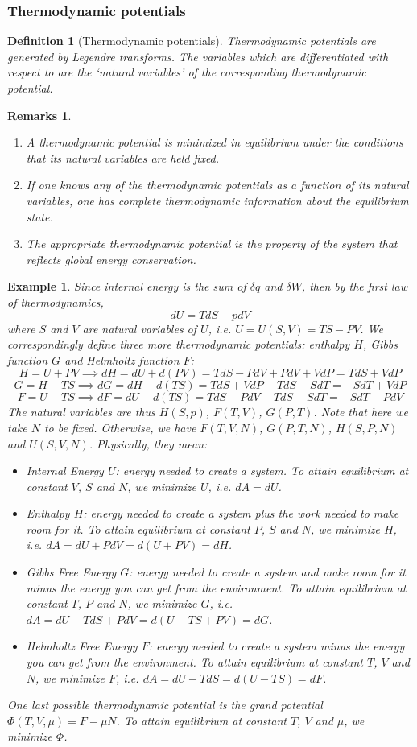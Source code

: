 \documentclass[a4paper]{article}
\newtheorem{eg}{Example}[section]
\newtheorem{remarks}{Remarks}[section]
\theoremstyle{new}
\newtheorem{defi}{Definition}[section]
\begin{document}
\subsubsection*{Thermodynamic potentials}
\begin{defi}[Thermodynamic potentials]
Thermodynamic potentials are generated by Legendre transforms. The variables which are differentiated with respect to are the `natural variables' of the corresponding thermodynamic potential.
\end{defi}
\begin{remarks}\leavevmode
\begin{enumerate}
    \item A thermodynamic potential is minimized in equilibrium under the conditions that its natural variables are held fixed.
    \item If one knows any of the thermodynamic potentials as a function of its natural variables, one has complete thermodynamic information about the equilibrium state.
    \item The appropriate thermodynamic potential is the property of the system that reflects global energy conservation.
\end{enumerate}
\end{remarks}
\begin{eg}
Since internal energy is the sum of $\delta q$ and $\delta W$, then by the first law of thermodynamics,
$$dU=TdS-pdV$$
where $S$ and $V$ are natural variables of $U$, i.e. $U=U(S,V)=TS-PV$. We correspondingly define three more thermodynamic potentials: enthalpy $H$, Gibbs function $G$ and Helmholtz function $F$:
$$H=U+PV\implies dH=dU+d(PV)=TdS-PdV+PdV+VdP=TdS+VdP$$
$$G=H-TS\implies dG=dH-d(TS)=TdS+VdP-TdS-SdT=-SdT+VdP$$
$$F=U-TS\implies dF=dU-d(TS)=TdS-PdV-TdS-SdT=-SdT-PdV$$
The natural variables are thus $H(S,p)$, $F(T,V)$, $G(P,T)$. Note that here we take $N$ to be fixed. Otherwise, we have $F(T,V,N)$, $G(P,T,N)$, $H(S,P,N)$ and $U(S,V,N)$. Physically, they mean:
\begin{itemize}
    \item Internal Energy $U$: energy needed to create a system. To attain equilibrium at constant $V$, $S$ and $N$, we minimize $U$, i.e. $dA=dU$.
    \item Enthalpy $H$: energy needed to create a system plus the work needed to make room for it. To attain equilibrium at constant $P$, $S$ and $N$, we minimize $H$, i.e. $dA=dU+PdV=d(U+PV)=dH$.
    \item Gibbs Free Energy $G$: energy needed to create a system and make room for it minus the energy you can get from the environment. To attain equilibrium at constant $T$, $P$ and $N$, we minimize $G$, i.e. $dA=dU-TdS+PdV=d(U-TS+PV)=dG$.
    \item Helmholtz Free Energy $F$: energy needed to create a system minus the energy you can get from the environment. To attain equilibrium at constant $T$, $V$ and $N$, we minimize $F$, i.e. $dA=dU-TdS=d(U-TS)=dF$.
\end{itemize}
One last possible thermodynamic potential is the grand potential $\Phi(T,V,\mu)=F-\mu N$. To attain equilibrium at constant $T$, $V$ and $\mu$, we minimize $\Phi$.
\end{eg}
\end{document}

